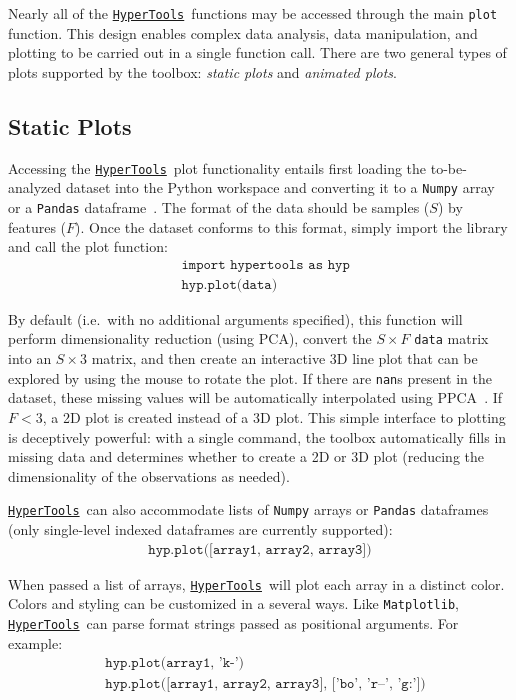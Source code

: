 \documentclass[12pt,letterpaper]{article}
\newcommand{\hypertools}{\href{https://github.com/ContextLab/hypertools}{\texttt{HyperTools}}}
\newcounter{example}
\begin{document}
Nearly all of the \hypertools~functions may be accessed through the main \texttt{plot} function.  This design enables complex data analysis, data manipulation, and plotting to be carried out in a single function call.  There are two general types of plots supported by the toolbox: \textit{static plots} and \textit{animated plots}.

\subsection*{Static Plots}
Accessing the \hypertools~plot functionality entails first loading the to-be-analyzed dataset into the Python workspace and converting it to a \texttt{Numpy} array~\cite{WaltEtal11} or a \texttt{Pandas} dataframe~\cite{Mcki10}. The format of the data should be samples ($S$) by features ($F$). Once the dataset conforms to this format, simply import the library and call the plot function:
\begin{align}
& \texttt{import hypertools as hyp} \\
& \texttt{hyp.plot(data)}
\end{align}

By default (i.e.\ with no additional arguments specified), this function will perform dimensionality reduction (using PCA), convert the $S \times F$ \texttt{data} matrix into an $S \times 3$ matrix, and then create an interactive 3D line plot that can be explored by using the mouse to rotate the plot. If there are \texttt{nan}s present in the dataset, these missing values will be automatically interpolated using PPCA~\cite{TippBish99}. If $F < 3$, a 2D plot is created instead of a 3D plot.  This simple interface to plotting is deceptively powerful: with a single command, the toolbox automatically fills in missing data and determines whether to create a 2D or 3D plot (reducing the dimensionality of the observations as needed).

\hypertools~can also accommodate lists of \texttt{Numpy} arrays or \texttt{Pandas} dataframes (only single-level indexed dataframes are currently supported):
\begin{align}
\texttt{hyp.plot([array1, array2, array3])}
\end{align}

When passed a list of arrays, \hypertools~will plot each array in a distinct color.  Colors and styling can be customized in a several ways.  Like \texttt{Matplotlib}, \hypertools~can parse format strings passed as positional arguments.  For example:
\begin{align}
& \texttt{hyp.plot(array1, 'k-')} \\
& \texttt{hyp.plot([array1, array2, array3], ['bo', 'r--', 'g:'])}
\end{align}
\end{document}
